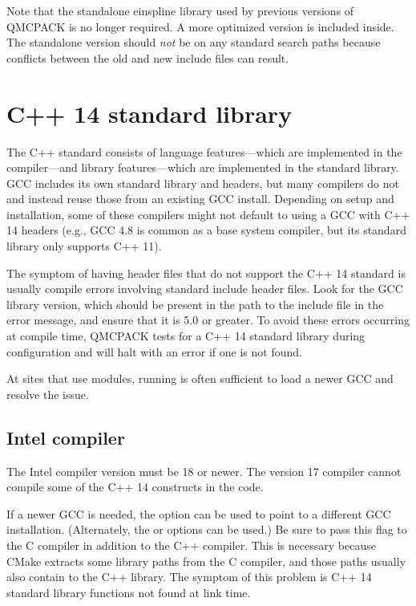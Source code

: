 Note that the standalone einspline library used by previous versions of QMCPACK
is no longer required. A more optimized version is included
inside. The standalone version should \emph{not} be on any standard
search paths because conflicts between the old and new include files
can result.

\section{C++ 14 standard library}
The C++ standard consists of language features---which are implemented in the compiler---and library features---which are implemented in the standard library.
GCC includes its own standard library and headers, but many compilers do not and instead reuse those from an existing GCC install.
Depending on setup and installation, some of these compilers might not default to using a GCC with C++ 14 headers (e.g., GCC 4.8 is common as a base system compiler, but its standard library only supports C++ 11).

The symptom of having header files that do not support the C++ 14 standard is usually
compile errors involving standard include header files.
Look for the GCC library version, which should be present in the path to the include file in the error message, and ensure that it is 5.0 or greater.
To avoid these errors occurring at compile time, QMCPACK tests for a C++ 14 standard
library during configuration and will halt with an error if one is not found.

At sites that use modules, running  is often sufficient to
load a newer GCC and resolve the issue.

\subsection{Intel compiler}
The Intel compiler version must be 18 or newer.
The version 17 compiler cannot compile some of the C++ 14 constructs in the code.

If a newer GCC is needed, the  option can be used to point to a different GCC installation.
(Alternately, the  or  options can be used.)
Be sure to pass this flag to the C compiler in addition to the C++ compiler.
This is necessary because CMake extracts some library paths from the C compiler, and those paths usually also contain to the C++ library.
The symptom of this problem is C++ 14 standard library functions not found at link time.


